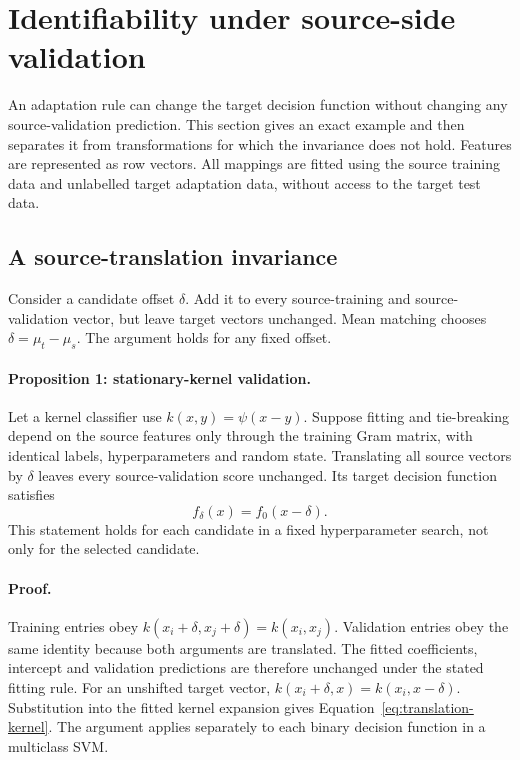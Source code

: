\section{Identifiability under source-side validation}
\label{sec:selection-theory}

An adaptation rule can change the target decision function without changing
any source-validation prediction. This section gives an exact example and then
separates it from transformations for which the invariance does not hold.
Features are represented as row vectors. All mappings are fitted using the
source training data and unlabelled target adaptation data, without access to
the target test data.

\subsection{A source-translation invariance}
\label{sec:translation-theory}

Consider a candidate offset $\delta$. Add it to every source-training and
source-validation vector, but leave target vectors unchanged. Mean matching
chooses $\delta=\mu_t-\mu_s$. The argument holds for any fixed offset.

\paragraph{Proposition 1: stationary-kernel validation.}
Let a kernel classifier use $k(x,y)=\psi(x-y)$. Suppose fitting and tie-breaking
depend on the source features only through the training Gram matrix, with
identical labels, hyperparameters and random state. Translating all source
vectors by $\delta$ leaves every source-validation score unchanged. Its target
decision function satisfies
\begin{equation}
 f_\delta(x)=f_0(x-\delta).
 \label{eq:translation-kernel}
\end{equation}
This statement holds for each candidate in a fixed hyperparameter search, not
only for the selected candidate.

\paragraph{Proof.}
Training entries obey $k(x_i+\delta,x_j+\delta)=k(x_i,x_j)$. Validation entries
obey the same identity because both arguments are translated. The fitted
coefficients, intercept and validation predictions are therefore unchanged
under the stated fitting rule. For an unshifted target vector,
$k(x_i+\delta,x)=k(x_i,x-\delta)$. Substitution into the fitted kernel expansion
gives Equation~\ref{eq:translation-kernel}. The argument applies separately
to each binary decision function in a multiclass SVM.

